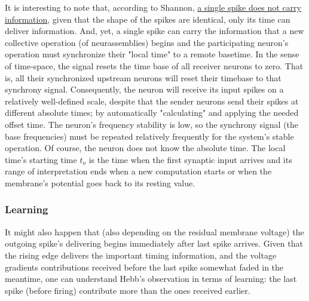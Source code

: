 It is interesting to note that, according to Shannon,
\hyperlink{SingleSpikeEntropy}{a single spike does not carry information}, given that the shape of the spikes are identical, only its time can deliver information. And, yet,
a single spike can carry the information that a new collective operation (of neurassemblies) begins and the participating neuron's operation must synchronize their "local time" to a remote basetime. In the sense of time-space, the signal resets the time base of all receiver neurons to zero. That is, all their synchronized upstream neurons will reset their timebase to that synchrony signal. Consequently, the neuron will receive its input spikes on a relatively well-defined scale, despite that the sender neurons send their spikes at different absolute times; by automatically "calculating" and applying
the needed offset time. 
The neuron's frequency stability is low, so the synchrony signal (the base frequencies) must be repeated relatively frequently for the system's stable operation.
 Of course, the neuron does not know the absolute time.
The local time's starting time $t_o$
is the time when the first synaptic input arrives and its range of interpretation ends when a new computation starts or when 
the membrane's potential goes back to its resting value.

\subsubsection[Learning]{Learning\label{sec:Single-OperationLearning}}

It might also happen that (also depending on the residual
membrane voltage) the outgoing spike's delivering begins
immediately after last spike arrives.
Given that the rising edge delivers the important timing information, and the voltage gradients contributions
received before the last spike somewhat faded in the meantime,
one can understand Hebb's observation in terms of learning: the last spike (before firing) contribute more than the ones
received earlier.




